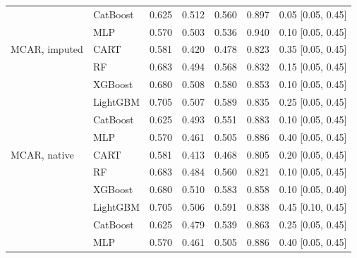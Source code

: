 \begin{table}[p]
\begin{tabular}{@{}llrrrrl@{}}
 & CatBoost & 0.625 & 0.512 & 0.560 & 0.897 & 0.05 [0.05, 0.45] \\
 & MLP & 0.570 & 0.503 & 0.536 & 0.940 & 0.10 [0.05, 0.45] \\
\midrule
MCAR, imputed & CART & 0.581 & 0.420 & 0.478 & 0.823 & 0.35 [0.05, 0.45] \\
 & RF & 0.683 & 0.494 & 0.568 & 0.832 & 0.15 [0.05, 0.45] \\
 & XGBoost & 0.680 & 0.508 & 0.580 & 0.853 & 0.10 [0.05, 0.45] \\
 & LightGBM & 0.705 & 0.507 & 0.589 & 0.835 & 0.25 [0.05, 0.45] \\
 & CatBoost & 0.625 & 0.493 & 0.551 & 0.883 & 0.10 [0.05, 0.45] \\
 & MLP & 0.570 & 0.461 & 0.505 & 0.886 & 0.40 [0.05, 0.45] \\
\midrule
MCAR, native & CART & 0.581 & 0.413 & 0.468 & 0.805 & 0.20 [0.05, 0.45] \\
 & RF & 0.683 & 0.484 & 0.560 & 0.821 & 0.10 [0.05, 0.45] \\
 & XGBoost & 0.680 & 0.510 & 0.583 & 0.858 & 0.10 [0.05, 0.40] \\
 & LightGBM & 0.705 & 0.506 & 0.591 & 0.838 & 0.45 [0.10, 0.45] \\
 & CatBoost & 0.625 & 0.479 & 0.539 & 0.863 & 0.25 [0.05, 0.45] \\
 & MLP & 0.570 & 0.461 & 0.505 & 0.886 & 0.40 [0.05, 0.45] \\
\bottomrule
\end{tabular}
\end{table}

